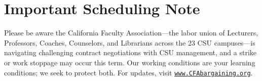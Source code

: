 \documentclass[10pt, letterpaper]{article}
\begin{document}
    \section*{Important Scheduling Note}

    Please be aware the California Faculty Association---the labor union of Lecturers, Professors, Coaches, Counselors, and Librarians across the 23 CSU campuses---is navigating challenging contract negotiations with CSU management, and a strike or work stoppage may occur this term. Our working conditions are your learning conditions; we seek to protect both. For updates, visit \href{www.CFAbargaining.org}{\texttt{www.CFAbargaining.org}}.
    

\singlespace


\end{document}
